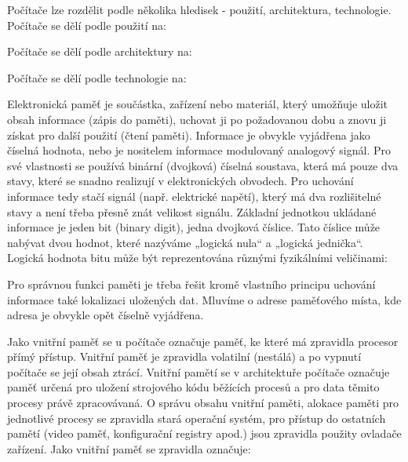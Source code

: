 
Počítače lze rozdělit podle několika hledisek - použití,  architektura, technologie.
Počítače se dělí podle použití na:

\vskip 4mm
\vskip 4mm

Počítače se dělí podle architektury na:

\vskip 4mm
\vskip 4mm

Počítače se dělí podle technologie na:

\vskip 4mm
\vskip 4mm


Elektronická paměť je součástka, zařízení nebo materiál, který umožňuje uložit obsah informace (zápis do paměti), uchovat ji po požadovanou dobu a znovu ji získat pro další použití (čtení paměti). Informace je obvykle vyjádřena jako číselná hodnota, nebo je nositelem informace modulovaný analogový signál. Pro své vlastnosti se používá binární (dvojková) číselná soustava, která má pouze dva stavy, které se snadno realizují v elektronických obvodech. Pro uchování informace tedy stačí signál (např. elektrické napětí), který má dva rozlišitelné stavy a není třeba přesně znát velikost signálu.
Základní jednotkou ukládané informace je jeden bit (binary digit), jedna dvojková číslice. Tato číslice může nabývat dvou hodnot, které nazýváme „logická nula“ a „logická jednička“. Logická hodnota bitu může být reprezentována různými fyzikálními veličinami:

\vskip 4mm
\vskip 4mm

Pro správnou funkci paměti je třeba řešit kromě vlastního principu uchování informace také lokalizaci uložených dat. Mluvíme o adrese paměťového místa, kde adresa je obvykle opět číselně vyjádřena.


Jako vnitřní paměť se u počítače označuje paměť, ke které má zpravidla procesor přímý přístup. Vnitřní paměť je zpravidla volatilní (nestálá) a po vypnutí počítače se její obsah ztrácí. Vnitřní pamětí se v architektuře počítače označuje paměť určená pro uložení strojového kódu běžících procesů a pro data těmito procesy právě zpracovávaná.
O správu obsahu vnitřní paměti, alokace paměti pro jednotlivé procesy se zpravidla stará operační systém, pro přístup do ostatních pamětí (video paměť, konfigurační registry apod.) jsou zpravidla použity ovladače zařízení.
Jako vnitřní paměť se zpravidla označuje:

